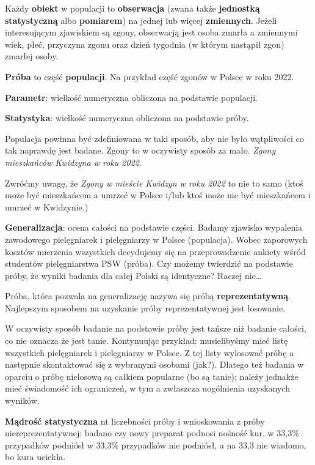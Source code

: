 \documentclass[
  openany]{book}
\begin{document}
Każdy \textbf{obiekt} w populacji to
\textbf{obserwacja} (zwana także \textbf{jednostką statystyczną} albo \textbf{pomiarem})
na jednej lub więcej \textbf{zmiennych}.
Jeżeli interesującym zjawiskiem są zgony, obserwacją jest osoba zmarła
a zmiennymi wiek,
płeć, przyczyna zgonu oraz dzień tygodnia (w którym nastąpił zgon) zmarłej osoby.

\textbf{Próba} to część \textbf{populacji}.
Na przykład część zgonów w Polsce w roku 2022.

\textbf{Parametr}: wielkość numeryczna obliczona na podstawie populacji.

\textbf{Statystyka}: wielkość numeryczna obliczona na podstawie próby.

Populacja powinna być zdefiniowana w taki sposób, aby nie było wątpliwości
co tak naprawdę jest badane. Zgony to w oczywisty sposób za mało.
\emph{Zgony mieszkańców Kwidzyna w roku 2022}.

Zwróćmy uwagę, że \emph{Zgony w mieście Kwidzyn w roku 2022} to nie to samo
(ktoś może być mieszkańcem
a umrzeć w Polsce i/lub ktoś może nie być mieszkańcem i umrzeć w Kwidzynie.)

\textbf{Generalizacja}: ocena całości na podstawie części. Badamy zjawisko wypalenia
zawodowego pielęgniarek i pielęgniarzy w Polsce (populacja). Wobec zaporowych kosztów
mierzenia wszystkich decydujemy się na przeprowadzenie ankiety wśród studentów
pielęgniarstwa PSW (próba). Czy możemy twierdzić na podstawie próby, że wyniki
badania dla całej Polski są identyczne? Raczej nie\ldots{}

Próba, która pozwala na generalizację nazywa się próbą \textbf{reprezentatywną}.
Najlepszym sposobem na uzyskanie próby reprezentatywnej jest losowanie.

W oczywisty sposób badanie na podstawie próby jest tańsze niż badanie całości, co nie
oznacza że jest tanie. Kontynuując przykład: musielibyśmy mieć listę wszystkich
pielęgniarek i pielęgniarzy w Polsce. Z tej listy wylosować próbę a następnie skontaktować
się z wybranymi osobami (jak?). Dlatego też badania w oparciu o próbę nielosową są całkiem
popularne (bo są tanie); należy jednakże mieć świadomość ich ograniczeń, w tym a zwłaszcza
uogólnienia uzyskanych wyników.

\textbf{Mądrość statystyczna} nt liczebności próby i wnioskowania z próby niereprezentatywnej:
badano czy nowy preparat podnosi
nośność kur, w 33,3\% przypadków podniósł w 33,3\% przypadków nie
podniósł, a na 33,3 nie wiadomo, bo kura uciekła.
\end{document}

